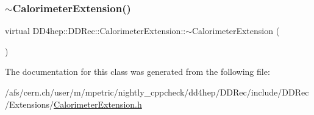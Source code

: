 \hypertarget{class_d_d4hep_1_1_d_d_rec_1_1_calorimeter_extension_a387851f2812749225010c8e3d174724f}{}\label{class_d_d4hep_1_1_d_d_rec_1_1_calorimeter_extension_a387851f2812749225010c8e3d174724f} 
\subsubsection{\texorpdfstring{$\sim$\+Calorimeter\+Extension()}{~CalorimeterExtension()}}
{\footnotesize\ttfamily virtual D\+D4hep\+::\+D\+D\+Rec\+::\+Calorimeter\+Extension\+::$\sim$\+Calorimeter\+Extension (\begin{DoxyParamCaption}{ }\end{DoxyParamCaption})\hspace{0.3cm}{\ttfamily [virtual]}}



The documentation for this class was generated from the following file\+:\begin{DoxyCompactItemize}
\item 
/afs/cern.\+ch/user/m/mpetric/nightly\+\_\+cppcheck/dd4hep/\+D\+D\+Rec/include/\+D\+D\+Rec/\+Extensions/\hyperlink{_calorimeter_extension_8h}{Calorimeter\+Extension.\+h}\end{DoxyCompactItemize}
